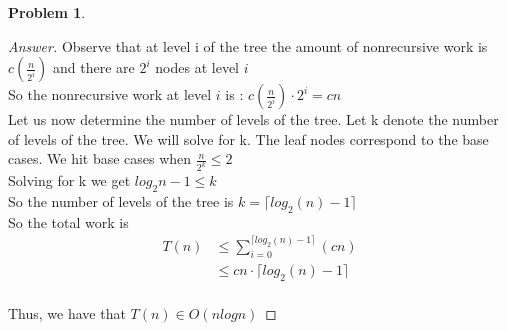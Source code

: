 \documentclass[11pt]{article}
\theoremstyle{definition}
\theoremstyle{definition}
\newtheorem{required}{Problem}
\theoremstyle{definition}
\begin{document}
\begin{required}
\begin{proof}[Answer]
Observe that at level i of the tree the amount of nonrecursive work is $c(\frac{n}{2^i})$ and there are $2^i$ nodes at level $i$ \\
So the nonrecursive work at level $i$ is : $c(\frac{n}{2^i})\cdot 2^i= cn$ \\

Let us now determine the number of levels of the tree. Let k denote the number of levels of the tree. We will solve for k. The leaf nodes correspond to the base cases. 
We hit base cases when $\frac{n}{2^k} \leq  2$ \\ 
Solving for k we get $log_2n-1 \leq k$ \\
So the number of levels of the tree is $k = \lceil log_2(n)-1\rceil$ \\

So the total work is \\
\begin{align*}
T(n) &\leq \sum_{i=0}^{\lceil log_2(n)-1\rceil}(cn)\\
&\leq cn\cdot \lceil log_2(n)-1\rceil \\
\end{align*}

Thus, we have that $T(n) \in O(nlogn)$

\end{proof}

\end{required}
\end{document}
